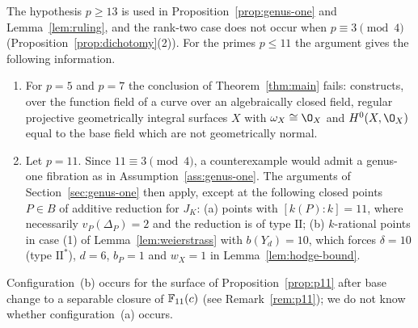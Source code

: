 \begin{remark}\label{rem:small-primes}
The hypothesis $p\geq 13$ is used in Proposition~\ref{prop:genus-one} and Lemma~\ref{lem:ruling}, and the rank-two case does not occur when $p\equiv 3\pmod 4$ (Proposition~\ref{prop:dichotomy}(2)).
For the primes $p\leq 11$ the argument gives the following information.
\begin{enumerate}
\item For $p = 5$ and $p = 7$ the conclusion of Theorem~\ref{thm:main} fails: \cite[Example~6.2 and Remark~1.5(2)]{WZ26} constructs, over the function field of a curve over an algebraically closed field, regular projective geometrically integral surfaces $X$ with $\omega_X\cong\O_X$ and $H^0(X,\O_X)$ equal to the base field which are not geometrically normal.
\item Let $p = 11$.
  Since $11\equiv 3\pmod 4$, a counterexample would admit a genus-one fibration as in Assumption~\ref{ass:genus-one}.
  The arguments of Section~\ref{sec:genus-one} then apply, except at the following closed points $P\in B$ of additive reduction for $J_K$: \textup{(a)} points with $[k(P):k] = 11$, where necessarily $v_P(\Delta_P) = 2$ and the reduction is of type $\mathrm{II}$; \textup{(b)} $k$-rational points in case \textup{(1)} of Lemma~\ref{lem:weierstrass} with $b(Y_d) = 10$, which forces $\delta = 10$ (type $\mathrm{II}^*$), $d = 6$, $b_P = 1$ and $w_X = 1$ in Lemma~\ref{lem:hodge-bound}.
\end{enumerate}
Configuration~\textup{(b)} occurs for the surface of Proposition~\ref{prop:p11} after base change to a separable closure of $\mathbb{F}_{11}(c)$ (see Remark~\ref{rem:p11}); we do not know whether configuration~\textup{(a)} occurs.
\end{remark}
